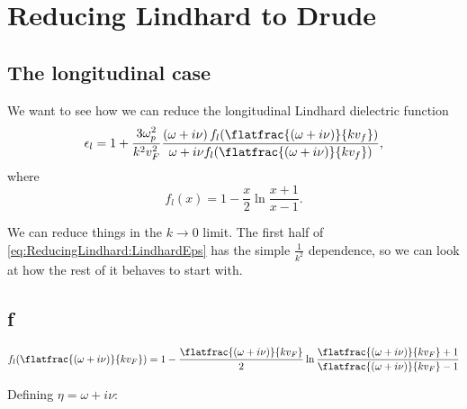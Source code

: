 \documentclass[../../main.tex]{subfiles}
\begin{document}
\section{Reducing Lindhard to Drude}
\subsection{The longitudinal case}
We want to see how we can reduce the longitudinal Lindhard dielectric function
\begin{equation} \label{eq:ReducingLindhard:LindhardEps} 
 \epsilon_l = 1 + \frac{3 \omega_p^2}{k^2 v_F^2} \frac{\left(\omega + i \nu \right) f_l(\flatfrac{(\omega + i \nu)}{k v_f})}{\omega + i \nu f_l(\flatfrac{(\omega + i \nu)}{k v_f})},
\end{equation}
where 
\begin{equation}
	f_l(x) = 1 - \frac{x}{2} \ln\frac{x + 1}{x - 1}.
\end{equation}

We can reduce things in the $k \rightarrow 0$ limit. The first half of \eqref{eq:ReducingLindhard:LindhardEps} has the simple $\frac{1}{k^2}$ dependence, so we can look at how the rest of it behaves to start with. 

\subsection{f}

\begin{align}
		f_l(\flatfrac{(\omega + i \nu)}{k v_F}) = 1 - \frac{\flatfrac{(\omega + i \nu)}{k v_F}}{2} \ln\frac{\flatfrac{(\omega + i \nu)}{k v_F} + 1}{\flatfrac{(\omega + i \nu)}{k v_F} - 1}
\end{align}

Defining $\eta = \omega + i \nu$:
\end{document}
